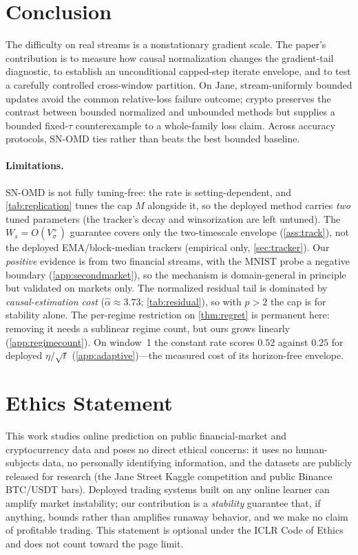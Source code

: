 \documentclass{article}
\begin{document}
\section{Conclusion}
\label{sec:conclusion}

The difficulty on real streams is a nonstationary gradient scale. The paper's contribution is
to measure how causal normalization changes the gradient-tail diagnostic, to establish an
unconditional capped-step iterate envelope, and to test a carefully controlled cross-window
partition. On Jane, stream-uniformly bounded updates avoid the common relative-loss failure
outcome; crypto preserves the contrast between bounded normalized and unbounded methods but supplies a bounded
fixed-$\tau$ counterexample to a whole-family loss claim. Across accuracy protocols, SN-OMD ties
rather than beats the best bounded baseline.

\paragraph{Limitations.} SN-OMD is not fully tuning-free: the rate is setting-dependent, and
\cref{tab:replication} tunes the cap $M$ alongside it, so the deployed method carries \emph{two}
tuned parameters (the tracker's decay and winsorization are left untuned). The $W_s=O(V_\sigma^+)$ guarantee covers only the two-timescale envelope
(\cref{ass:track}), not the deployed EMA/block-median trackers (empirical only,
\cref{sec:tracker}). Our
\emph{positive} evidence is from two financial streams, with the MNIST probe a negative boundary
(\cref{app:secondmarket}), so the mechanism is domain-general in principle but validated on
markets only. The normalized residual tail is dominated by
\emph{causal-estimation cost} ($\hat\alpha\approx3.73$; \cref{tab:residual}), so with $p>2$ the
cap is for stability alone. The per-regime restriction on \cref{thm:regret} is permanent here:
removing it needs a sublinear regime count, but ours grows linearly (\cref{app:regimecount}). On
window~1 the constant rate scores $0.52$ against $0.25$ for deployed $\eta/\sqrt t$
(\cref{app:adaptive})---the measured cost of its horizon-free envelope.

\section*{Ethics Statement}
This work studies online prediction on public financial-market and cryptocurrency data and
poses no direct ethical concerns: it uses no human-subjects data, no personally identifying
information, and the datasets are publicly released for research (the Jane Street Kaggle
competition and public Binance BTC/USDT bars). Deployed trading systems built on any online
learner can amplify market instability; our contribution is a \emph{stability} guarantee that,
if anything, bounds rather than amplifies runaway behavior, and we make no claim of profitable
trading. This statement is optional under the ICLR Code of Ethics and does not count toward the
page limit.
\end{document}
